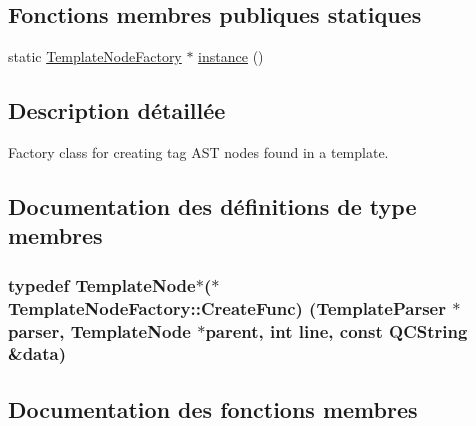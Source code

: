 \subsection*{Fonctions membres publiques statiques}
\begin{DoxyCompactItemize}
\item 
static \hyperlink{class_template_node_factory}{Template\+Node\+Factory} $\ast$ \hyperlink{class_template_node_factory_ab70bb43cedfb3ac75cec15d97391b6f9}{instance} ()
\end{DoxyCompactItemize}


\subsection{Description détaillée}
Factory class for creating tag A\+S\+T nodes found in a template. 

\subsection{Documentation des définitions de type membres}
\hypertarget{class_template_node_factory_a59ae33c1e37ddecd982358a5417fab31}{}
\subsubsection[{Create\+Func}]{\setlength{\rightskip}{0pt plus 5cm}typedef {\bf Template\+Node}$\ast$($\ast$ Template\+Node\+Factory\+::\+Create\+Func) ({\bf Template\+Parser} $\ast$parser, {\bf Template\+Node} $\ast$parent, int line, const {\bf Q\+C\+String} \&data)}\label{class_template_node_factory_a59ae33c1e37ddecd982358a5417fab31}


\subsection{Documentation des fonctions membres}
\hypertarget{class_template_node_factory_acad608d0e42a69f2e4ad3caa05388d32}{}

